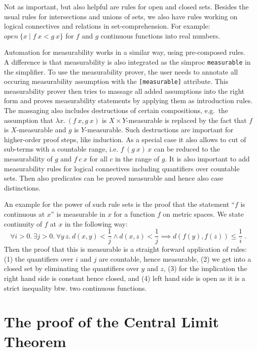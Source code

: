 \documentclass{svjour3}
\begin{document}
Not as important, but also helpful are rules for open and closed sets. Besides the usual rules for intersections and unions of sets, we also have rules working on logical connectives and relations in set-comprehension. For example: $open~\{x \mid f~x < g~x \}$ for $f$ and $g$ continuous functions into real numbers.

Automation for measurability works in a similar way, using pre-composed rules. A difference is that measurability is also integrated as the simproc \texttt{measurable} in the simplifier. To use the measurability prover, the user needs to annotate all occuring measurability assumption with the \texttt{[measurable]} attribute. This measurability prover then tries to massage all added assumptions into the right form and proves measurability statements by applying them as introduction rules. The massaging also includes destructions of certain compositions, e.g.~the assumption that $\lambda x.~(f~x, g~x)$ is $X \times Y$-measurable is replaced by the fact that $f$ is $X$-measurable and $g$ is $Y$-measurable. Such destructions are important for higher-order proof steps, like induction. As a special case it also allows to cut of sub-terms with a countable range, i.e. $f~(g~x)~x$ can be reduced to the measurability of $g$ and $f~c~x$ for all $c$ in the range of $g$. It is also important to add measurability rules for logical connectives including quantifiers over countable sets. Then also predicates can be proved measurable and hence also case distinctions.

An example for the power of such rule sets is the proof that the statement ``$f$ is continuous at $x$'' is measurable in $x$ for a function $f$ on metric spaces. We state continuity of $f$ at $x$ in the following way:
%
\[ \forall i>0.~ \exists j>0.~ \forall y\,z.~ d(x, y) < \frac{1}{j} \land
  d(x, z) < \frac{1}{j} \implies d(f(y), f(z)) \le \frac{1}{i}~. \]
%
Then the proof that this is measurable is a straight forward application of rules: (1) the quantifiers over $i$ and $j$ are countable, hence measurable, (2) we get into a closed set by eliminating the quantifiers over $y$ and $z$, (3) for the implication the right hand side is constant hence closed, and (4) left hand side is open as it is a strict inequality btw. two continuous functions. 

\section{The proof of the Central Limit Theorem}
\label{section:formal}
\end{document}
